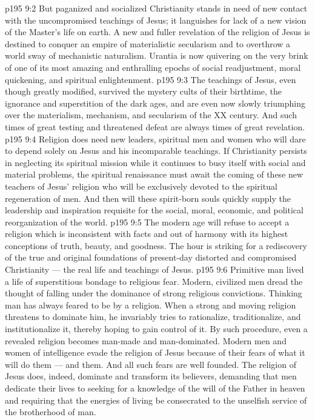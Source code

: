 \vs p195 9:2 But paganized and socialized Christianity stands in need of new contact with the uncompromised teachings of Jesus; it languishes for lack of a new vision of the Master’s life on earth. A new and fuller revelation of the religion of Jesus is destined to conquer an empire of materialistic secularism and to overthrow a world sway of mechanistic naturalism. Urantia is now quivering on the very brink of one of its most amazing and enthralling epochs of social readjustment, moral quickening, and spiritual enlightenment.
\vs p195 9:3 The teachings of Jesus, even though greatly modified, survived the mystery cults of their birthtime, the ignorance and superstition of the dark ages, and are even now slowly triumphing over the materialism, mechanism, and secularism of the XX century. And such times of great testing and threatened defeat are always times of great revelation.
\vs p195 9:4 \pc Religion does need new leaders, spiritual men and women who will dare to depend solely on Jesus and his incomparable teachings. If Christianity persists in neglecting its spiritual mission while it continues to busy itself with social and material problems, the spiritual renaissance must await the coming of these new teachers of Jesus’ religion who will be exclusively devoted to the spiritual regeneration of men. And then will these spirit\hyp{}born souls quickly supply the leadership and inspiration requisite for the social, moral, economic, and political reorganization of the world.
\vs p195 9:5 The modern age will refuse to accept a religion which is inconsistent with facts and out of harmony with its highest conceptions of truth, beauty, and goodness. The hour is striking for a rediscovery of the true and original foundations of present\hyp{}day distorted and compromised Christianity --- the real life and teachings of Jesus.
\vs p195 9:6 \pc Primitive man lived a life of superstitious bondage to religious fear. Modern, civilized men dread the thought of falling under the dominance of strong religious convictions. Thinking man has always feared to be  by a religion. When a strong and moving religion threatens to dominate him, he invariably tries to rationalize, traditionalize, and institutionalize it, thereby hoping to gain control of it. By such procedure, even a revealed religion becomes man\hyp{}made and man\hyp{}dominated. Modern men and women of intelligence evade the religion of Jesus because of their fears of what it will do  them --- and  them. And all such fears are well founded. The religion of Jesus does, indeed, dominate and transform its believers, demanding that men dedicate their lives to seeking for a knowledge of the will of the Father in heaven and requiring that the energies of living be consecrated to the unselfish service of the brotherhood of man.
